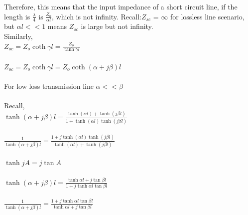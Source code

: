 Therefore, this means that the input impedance of a short circuit line, if the length is $ \frac{\lambda}{4} $ is $ \frac{Z_{o}}{\alpha l} $, which is not infinity. Recall:$ Z_{sc} $ = $ \infty $ for lossless line scenario, but $ \alpha l << 1 $ means $ Z_{sc} $ is large but not infinity.\\

Similarly,\\
$ Z_{oc}=Z_{o}\coth\gamma l=\frac{Z_{o}}{\tanh\gamma l} $\\\\
$ Z_{oc}=Z_{o}\coth\gamma l=Z_{o}\coth(\alpha+j\beta) l $\\\\
For low loss transmission line $ \alpha<<\beta $ \\\\Recall,\\
$ \tanh(\alpha+j\beta)l=\frac{\tanh (\alpha l) + \tanh (j\beta l)}{1 + \tanh (\alpha l)\tanh (j\beta l)} $\\\\
$ \frac{1}{\tanh(\alpha+j\beta)l}=\frac{1 + j\tanh (\alpha l)\tanh (j\beta l)}{\tanh (\alpha l) + \tanh (j\beta l)} $\\\\
$ \tanh jA= j \tan A $\\\\
$ \tanh(\alpha+j\beta)l=\frac{\tanh \alpha l+j\tan \beta l}{1+j\tanh \alpha l\tan \beta l} $\\\\
$ \frac{1}{\tanh(\alpha+j\beta)l}=\frac{1+j\tanh \alpha l\tan \beta l}{\tanh \alpha l+j\tan \beta l} $

